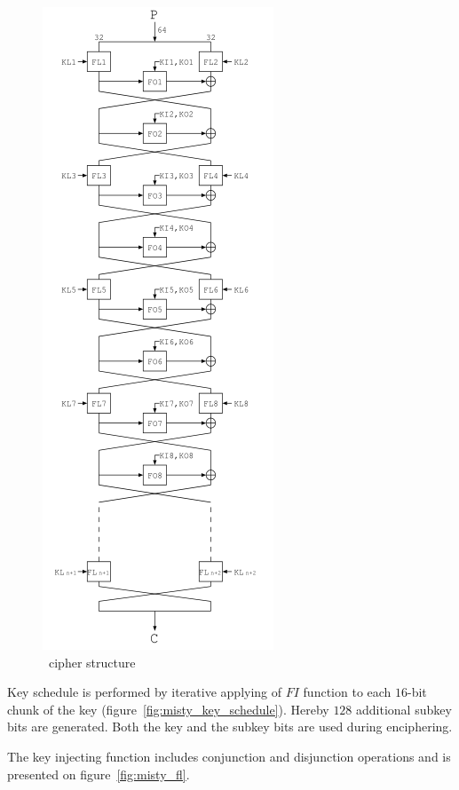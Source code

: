 \begin{figure}[htbp]
	\centering
    \includegraphics[scale=0.7]{images/misty_feistel}
	\caption{\misty\ cipher structure}
    \label{fig:misty_feistel}
\end{figure}

Key schedule is performed by iterative applying of $FI$ function to each
$16$-bit chunk of the key (figure~\ref{fig:misty_key_schedule}). Hereby $128$
additional subkey bits are generated.  Both the key and the subkey bits are used
during enciphering.

The key injecting function includes conjunction and disjunction operations and
is presented on figure~\ref{fig:misty_fl}.

